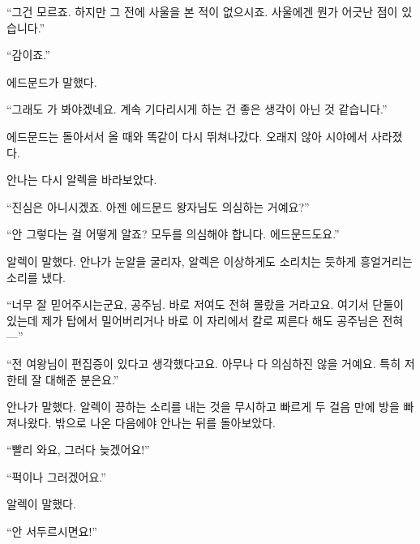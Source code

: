 ``그건 모르죠. 하지만 그 전에 사울을 본 적이 없으시죠. 사울에겐 뭔가 어긋난 점이 있습니다.''

``감이죠.''

에드문드가 말했다.

``그래도 가 봐야겠네요. 계속 기다리시게 하는 건 좋은 생각이 아닌 것 같습니다.''

에드문드는 돌아서서 올 때와 똑같이 다시 뛰쳐나갔다. 오래지 않아 시야에서 사라졌다.

안나는 다시 알렉을 바라보았다.

``진심은 아니시겠죠. 아젠 에드문드 왕자님도 의심하는 거예요?''

``안 그렇다는 걸 어떻게 알죠? 모두를 의심해야 합니다. 에드문드도요.''

알렉이 말했다. 안나가 눈알을 굴리자, 알렉은 이상하게도 소리치는 듯하게 흥얼거리는 소리를 냈다.

``너무 잘 믿어주시는군요, 공주님. 바로 저여도 전혀 몰랐을 거라고요. 여기서 단둘이 있는데 제가 탑에서 밀어버리거나 바로 이 자리에서 칼로 찌른다 해도 공주님은 전혀—''

``전 여왕님이 편집증이 있다고 생각했다고요. 아무나 다 의심하진 않을 거예요. 특히 저한테 잘 대해준 분은요.''

안나가 말했다. 알렉이 끙하는 소리를 내는 것을 무시하고 빠르게 두 걸음 만에 방을 빠져나왔다. 밖으로 나온 다음에야 안나는 뒤를 돌아보았다.

``빨리 와요, 그러다 늦겠어요!''

``퍽이나 그러겠어요.''

알렉이 말했다.

``안 서두르시면요!''

